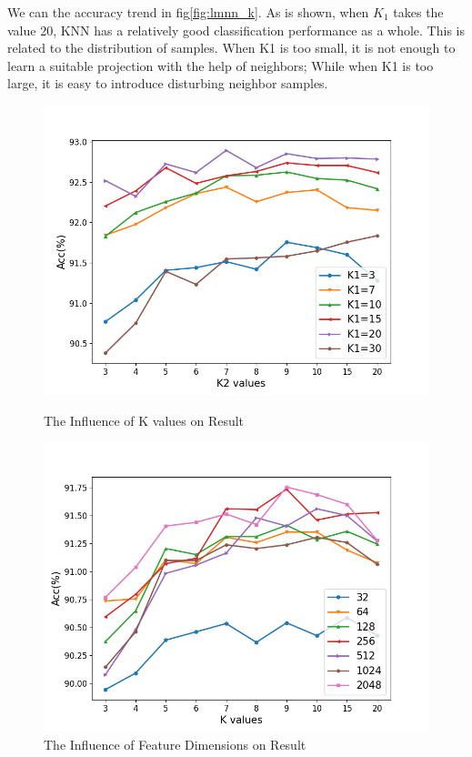 We can the accuracy trend in fig\ref{fig:lmnn_k}. As is shown, when $K_1$ takes the value 20, KNN has a relatively good classification performance as a whole. This is related to the distribution of samples. When K1 is too small, it is not enough to learn a suitable projection with the help of neighbors; While when K1 is too large, it is easy to introduce disturbing neighbor samples.
\begin{figure}
\centering
\begin{minipage}[t]{0.48\linewidth}
\centering
\includegraphics[width=1.0\linewidth]{img/LMNN_K.png}
\caption{The Influence of K values on Result}
\label{fig:lmnn_k}
\end{minipage}
\begin{minipage}[t]{0.48\linewidth}
\centering
\includegraphics[width=1.0\linewidth]{img/LMNN_res.png}
\caption{The Influence of Feature Dimensions on Result}
\label{fig:lmnn_res}
\end{minipage}
\end{figure}


